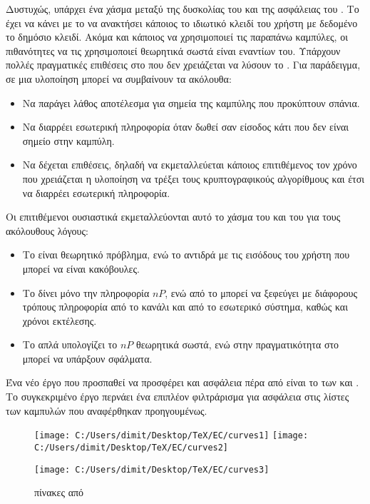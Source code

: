 \documentclass[oneside,a4paper]{article}
\begin{document}
Δυστυχώς, υπάρχει ένα χάσμα μεταξύ της δυσκολίας του  και της ασφάλειας του . Το  έχει να κάνει με το να ανακτήσει κάποιος το ιδιωτικό κλειδί του  χρήστη με δεδομένο το δημόσιο κλειδί. Ακόμα και κάποιος να χρησιμοποιεί τις παραπάνω καμπύλες, οι πιθανότητες να τις χρησιμοποιεί θεωρητικά σωστά είναι εναντίων του. Υπάρχουν πολλές πραγματικές επιθέσεις στο  που δεν χρειάζεται να λύσουν το . Για παράδειγμα, σε μια υλοποίηση μπορεί να συμβαίνουν τα ακόλουθα:
\begin{itemize}
	\item Να παράγει λάθος αποτέλεσμα για σημεία της καμπύλης που προκύπτουν σπάνια.
	\item Να διαρρέει εσωτερική πληροφορία όταν δωθεί σαν είσοδος κάτι που δεν είναι σημείο στην καμπύλη.
	\item Να δέχεται  επιθέσεις, δηλαδή να εκμεταλλεύεται κάποιος επιτιθέμενος τον χρόνο που χρειάζεται η υλοποίηση να τρέξει τους κρυπτογραφικούς αλγορίθμους και έτσι να διαρρέει εσωτερική πληροφορία.
\end{itemize} 

Οι επιτιθέμενοι ουσιαστικά εκμεταλλεύονται αυτό το χάσμα του  και του  για τους ακόλουθους λόγους:
\begin{itemize}
	\item Το  είναι θεωρητικό πρόβλημα, ενώ το  αντιδρά με τις εισόδους του χρήστη που μπορεί να είναι κακόβουλες.
	\item Το  δίνει μόνο την πληροφορία $nP$, ενώ από το  μπορεί να ξεφεύγει με διάφορους τρόπους πληροφορία από το κανάλι και από το εσωτερικό σύστημα, καθώς και χρόνοι εκτέλεσης.
	\item Το  απλά υπολογίζει το $nP$ θεωρητικά σωστά, ενώ στην πραγματικότητα στο  μπορεί να υπάρξουν σφάλματα.
\end{itemize}

Ένα νέο έργο που προσπαθεί να προσφέρει και  ασφάλεια πέρα από  είναι το  των  και  . Το συγκεκριμένο έργο περνάει ένα επιπλέον φιλτράρισμα για  ασφάλεια στις λίστες των καμπυλών που αναφέρθηκαν προηγουμένως.

\begin{figure}[H]
	\centering
	\texttt{[image: C:/Users/dimit/Desktop/TeX/EC/curves1]}
	\texttt{[image: C:/Users/dimit/Desktop/TeX/EC/curves2]}
\end{figure}
\begin{figure}[H]
	\centering

	\texttt{[image: C:/Users/dimit/Desktop/TeX/EC/curves3]}
	\captionsetup{labelformat=empty}
	\caption{πίνακες από }
\end{figure}
\end{document}
